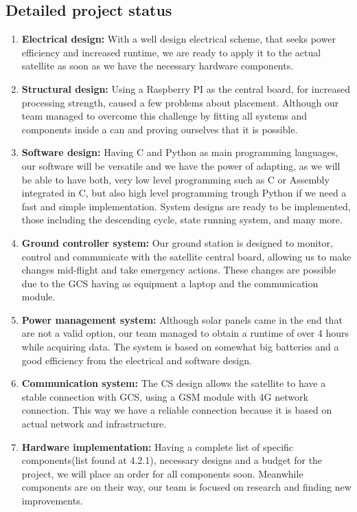 \documentclass[11pt]{article}
\begin{document}
\subsection{Detailed project status}
\begin{enumerate}
    \item\textbf{Electrical design:}  {With a well design electrical scheme, that seeks power efficiency and increased runtime, we are ready to apply it to the actual satellite as soon as we have the necessary hardware components.}
    \item\textbf{Structural design:} {Using a Raspberry PI as the central board, for increased processing strength, caused a few problems about placement. Although our team managed to overcome this challenge by fitting all systems and components inside a can and proving ourselves that it is possible.}
    \item\textbf{Software design:} {Having C and Python as main programming languages, our software will be versatile and we have the power of adapting, as we will be able to have both, very low level programming such as C or Assembly integrated in C, but also high level programming trough Python if we need a fast and simple implementation. System designs are ready to be implemented, those including the descending cycle, state running system, and many more.}
    \item\textbf{Ground controller system:} {Our ground station is designed to monitor, control and communicate with the satellite central board, allowing us to make changes mid-flight and take emergency actions. These changes are possible due to the GCS having as equipment a laptop and the communication module.}
    \item\textbf{Power management system:} {Although solar panels came in the end that are not a valid option, our team managed to obtain a runtime of over 4 hours while acquiring data. The system is based on somewhat big batteries and a good efficiency from the electrical and software design.}
    \item\textbf{Communication system:} {The CS design allows the satellite to have a stable connection with GCS, using a GSM module with 4G network connection. This way we have a reliable connection because it is based on actual network and infrastructure.}
    \item\textbf{Hardware implementation:} {Having a complete list of specific components(list found at 4.2.1), necessary designs and a budget for the project, we will place an order for all components soon. Meanwhile components are on their way, our team is focused on research and finding new improvements.}

\end{enumerate}
\end{document}

